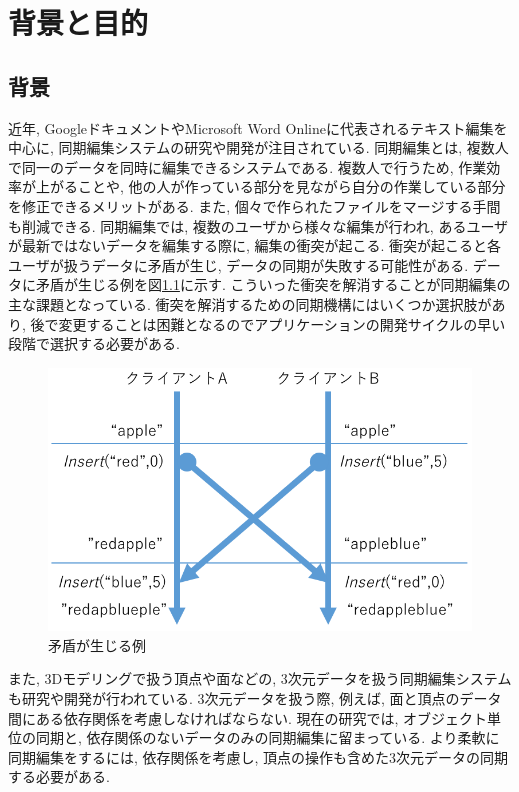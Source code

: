 \chapter{背景と目的}\label{chap:background}

\section{背景}
近年, Googleドキュメント\cite{GOOGLEDOCS}やMicrosoft Word Online\cite{WORDONLINE}に代表されるテキスト編集を中心に, 同期編集システムの研究や開発が注目されている.
同期編集とは, 複数人で同一のデータを同時に編集できるシステムである.
複数人で行うため, 作業効率が上がることや, 他の人が作っている部分を見ながら自分の作業している部分を修正できるメリットがある.
また, 個々で作られたファイルをマージする手間も削減できる.
同期編集では, 複数のユーザから様々な編集が行われ, あるユーザが最新ではないデータを編集する際に, 編集の衝突が起こる. 衝突が起こると各ユーザが扱うデータに矛盾が生じ, データの同期が失敗する可能性がある. データに矛盾が生じる例を図\ref{mujyun}に示す.
こういった衝突を解消することが同期編集の主な課題となっている.
衝突を解消するための同期機構にはいくつか選択肢があり, 後で変更することは困難となるのでアプリケーションの開発サイクルの早い段階で選択する必要がある.
\begin{figure}[htbp]
  \begin{center}
    \includegraphics[scale=0.3]{images/mujyun}
    \caption{矛盾が生じる例}
    \label{mujyun}
  \end{center}
\end{figure}
\par
また, 3Dモデリングで扱う頂点や面などの, 3次元データを扱う同期編集システムも研究や開発が行われている. 3次元データを扱う際, 例えば, 面と頂点のデータ間にある依存関係を考慮しなければならない. 現在の研究では, オブジェクト単位の同期と, 依存関係のないデータのみの同期編集に留まっている. より柔軟に同期編集をするには, 依存関係を考慮し, 頂点の操作も含めた3次元データの同期する必要がある.


